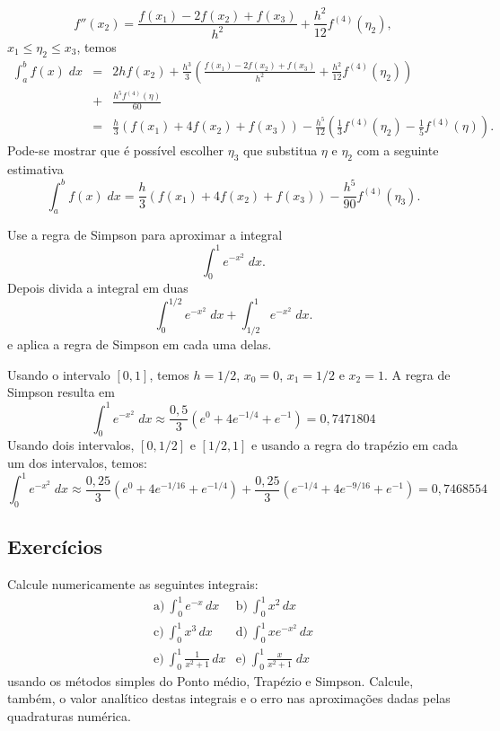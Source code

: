 $$
f''(x_2)=\frac{f(x_1)-2f(x_2)+f(x_3)}{h^2}+\frac{h^2}{12}f^{(4)}(\eta_2),
$$
$x_1\leq \eta_2\leq x_3$, temos
\begin{eqnarray*}
\int_a^bf(x)\;dx&=&2hf(x_2)+\frac{h^3}{3}\left(\frac{f(x_1)-2f(x_2)+f(x_3)}{h^2}+\frac{h^2}{12}f^{(4)}(\eta_2)\right)\\
&+&\frac{h^5f^{(4)}(\eta)}{60}\\
&=&\frac{h}{3}\left(f(x_1)+4f(x_2)+f(x_3)\right)-\frac{h^5}{12}\left(\frac{1}{3}f^{(4)}(\eta_2)-\frac{1}{5}f^{(4)}(\eta)\right).
\end{eqnarray*}
Pode-se mostrar que é possível escolher $\eta_3$ que substitua $\eta$ e $\eta_2$ com a seguinte estimativa
$$
\int_a^bf(x)\;dx=\frac{h}{3}\left(f(x_1)+4f(x_2)+f(x_3)\right)-\frac{h^5}{90}f^{(4)}(\eta_3).
$$

\begin{ex}
Use a regra de Simpson para aproximar a integral
$$
\int_0^1e^{-x^2}\;dx.
$$
Depois divida a integral em duas
$$
\int_0^{1/2}e^{-x^2}\;dx+\int_{1/2}^{1}e^{-x^2}\;dx.
$$
e aplica a regra de Simpson em cada uma delas.
\end{ex}
Usando o intervalo $[0,1]$, temos $h=1/2$, $x_0=0$, $x_1=1/2$ e $x_2=1$. A regra de Simpson resulta em
$$
\int_0^1e^{-x^2}\;dx\approx \frac{0,5}{3}(e^{0}+4e^{-1/4}+e^{-1})=0,7471804
$$
Usando dois intervalos, $[0,1/2]$ e $[1/2,1]$ e usando a regra do trapézio em cada um dos intervalos, temos:
$$
\int_0^1e^{-x^2}\;dx\approx \frac{0,25}{3}(e^{0}+4e^{-1/16}+e^{-1/4})+\frac{0,25}{3}(e^{-1/4}+4e^{-9/16}+e^{-1})=0,7468554
$$

\subsection*{Exercícios}

\begin{exer}Calcule numericamente as seguintes integrais:
  \begin{eqnarray*}
    \text{a)}~\int_0^1e^{-x}\,dx & \text{b)}~\int_0^1x^2\,dx\\
    \text{c)}~\int_0^1x^3\,dx & \text{d)}~\int_0^1xe^{-x^2}\,dx\\
    \text{e)}~\int_0^1\frac{1}{x^2+1}\,dx &\text{e)}~\int_0^1\frac{x}{x^2+1}\;dx 
  \end{eqnarray*}
usando os métodos simples do Ponto médio, Trapézio e Simpson. Calcule, também, o valor analítico destas integrais e o erro nas aproximações dadas pelas quadraturas numérica.
\end{exer}
%   

